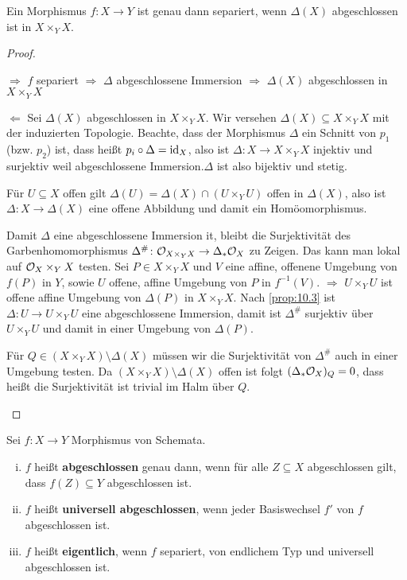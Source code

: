 \begin{prop}
  \label{prop:10.4}
  Ein Morphismus $f \colon X \to Y$ ist genau dann separiert, wenn $\Delta(X)$ abgeschlossen ist in $X \times_Y X$.
  \begin{proof}
    \begin{description}
    \item{\glqq$\boldsymbol{\Rightarrow}$\grqq} $f$ separiert $\Rightarrow$ $\Delta$ abgeschlossene Immersion $\Rightarrow$ $\Delta(X)$ abgeschlossen in $X \times_Y X$
    \item{\glqq$\boldsymbol{\Leftarrow}$\grqq} Sei $\Delta(X)$ abgeschlossen in $X \times_Y X$. Wir versehen $\Delta(X) \subseteq X \times_Y X$ mit der induzierten Topologie. Beachte, dass der Morphismus $\Delta$ ein Schnitt von $p_1$ (bzw. $p_2$) ist, dass heißt $p_i \circ \Delta = \operatorname{id}_X$, also ist $\Delta \colon X \to X \times_Y X$ injektiv und surjektiv weil abgeschlossene Immersion.$\Delta$ ist also bijektiv und stetig.
      
      Für $U\subseteq X$ offen gilt $\Delta(U) = \Delta(X) \cap (U \times_Y U)$ offen in $\Delta(X)$, also ist $\Delta \colon X \to \Delta(X)$ eine offene Abbildung und damit ein Homöomorphismus.

      Damit $\Delta$ eine abgeschlossene Immersion it, bleibt die Surjektivität des Garbenhomomorphismus $\Delta^\#\colon \mathcal{O}_{X \times_Y X} \to \Delta_*  \mathcal{O}_X$ zu Zeigen. Das kann man lokal auf $\mathcal{O}_X \times_Y X$ testen. Sei $P \in X \times_Y X$ und $V$ eine affine, offenene Umgebung von $f(P)$ in $Y$, sowie $U$ offene, affine Umgebung von $P$ in $f^{-1}(V)$. $\Rightarrow$ $U \times_Y U$ ist offene affine Umgebung von $\Delta(P)$ in $X \times_Y X$. Nach \ref{prop:10.3} ist $\Delta\colon U \to U \times_Y U$ eine abgeschlossene Immersion, damit ist $\Delta^\#$ surjektiv über $U \times_Y U$ und damit in einer Umgebung von $\Delta(P)$.

      Für $Q \in (X \times_Y X) \setminus \Delta(X)$ müssen wir die Surjektivität von $\Delta^\#$ auch in einer Umgebung testen. Da $(X \times_Y X) \setminus \Delta(X)$ offen ist folgt $(\Delta_* \mathcal{O}_X)_Q = 0$, dass heißt die Surjektivität ist trivial im Halm über $Q$.
    \end{description}
  \end{proof}
\end{prop}

\begin{defn}
  \label{defn:10.5}
  Sei $f \colon X \to Y$ Morphismus von Schemata.
  \begin{enumerate}[i)]
  \item $f$ heißt \textbf{abgeschlossen} genau dann, wenn für alle $Z \subseteq X$ abgeschlossen gilt, dass $f(Z)\subseteq Y$ abgeschlossen ist.
  \item $f$ heißt \textbf{universell abgeschlossen}, wenn jeder Basiswechsel $f'$ von $f$ abgeschlossen ist.
  \item $f$ heißt \textbf{eigentlich}, wenn $f$ separiert, von endlichem Typ und universell abgeschlossen ist.
  \end{enumerate}
\end{defn}

